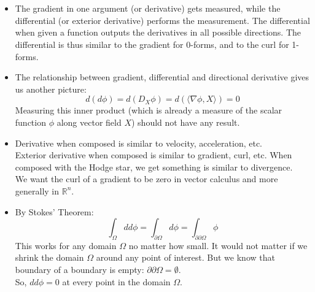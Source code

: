 \documentclass{article}
\begin{document}
\pagebreak
{}\\\\

\begin{itemize}

    \item
    The gradient in one argument (or derivative) gets measured, while the differential (or exterior derivative) performs the
    measurement. The differential when given a function outputs the derivatives in all possible directions.
    The differential is thus similar to the gradient for 0-forms, and to the curl for 1-forms.

    \item
    The relationship between gradient, differential and directional derivative gives us another picture:
    $$
        d(d\phi) = d(D_X\phi) = d(\langle \nabla\phi, X \rangle) = 0
    $$
    Measuring this inner product (which is already a measure of the scalar function $\phi$ along vector field $X$)
    should not have any result.

    \item
    Derivative when composed is similar to velocity, acceleration, etc.\\
    Exterior derivative when composed is similar to gradient, curl, etc.
    When composed with the Hodge star, we get something is similar to divergence.\\
    We want the curl of a gradient to be zero in vector calculus and more generally in $\mathbb{R}^n$.

    \item
    By Stokes' Theorem:
    $$
        \int_\Omega dd\phi = \int_{\partial\Omega} d\phi = \int_{\partial\partial\Omega} \phi
    $$
    This works for any domain $\Omega$ no matter how small. It would not matter if we shrink the domain $\Omega$
    around any point of interest. But we know that boundary of a boundary is empty: $\partial\partial\Omega = \emptyset$.\\
    So, $dd\phi = 0$ at every point in the domain $\Omega$.

\end{itemize}


\vspace{1.8cm}
\\\\
\end{document}
